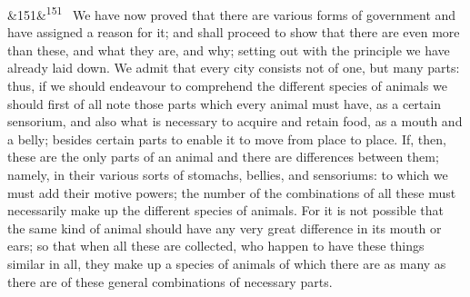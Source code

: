 \documentclass[12pt]{article}
\newcommand{\para}[1][]{\par\noindent\ifx&#1&\else\textsuperscript{\footnotesize #1}~\fi}
\begin{document}
\para[151] We have now proved that there are various forms of government and have assigned a reason for it; and shall proceed to show that there are even more than these, and what they are, and why; setting out with the principle we have already laid down. We admit that every city consists not of one, but many parts: thus, if we should endeavour to comprehend the different species of animals we should first of all note those parts which every animal must have, as a certain sensorium, and also what is necessary to acquire and retain food, as a mouth and a belly; besides certain parts to enable it to move from place to place. If, then, these are the only parts of an animal and there are differences between them; namely, in their various sorts of stomachs, bellies, and sensoriums: to which we must add their motive powers; the number of the combinations of all these must necessarily make up the different species of animals. For it is not possible that the same kind of animal should have any very great difference in its mouth or ears; so that when all these are collected, who happen to have these things similar in all, they make up a species of animals of which there are as many as there are of these general combinations of necessary parts.
\end{document}
